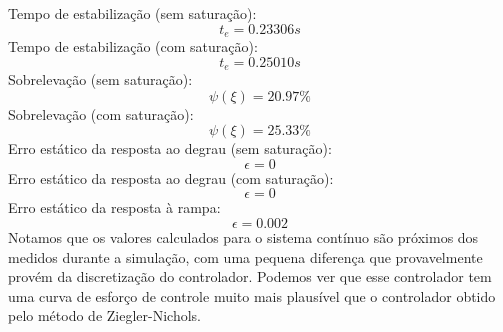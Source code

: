 \documentclass{article}
\begin{document}
Tempo de estabilização (sem saturação):
\begin{equation}
t_{e} = 0.23306 s
\end{equation}
Tempo de estabilização (com saturação):
\begin{equation}
t_{e} = 0.25010 s
\end{equation}
Sobrelevação (sem saturação):
\begin{equation}
\psi(\xi) = 20.97\%
\end{equation}
Sobrelevação (com saturação):
\begin{equation}
\psi(\xi) = 25.33\%
\end{equation}
Erro estático da resposta ao degrau (sem saturação):
\begin{equation}
\epsilon = 0
\end{equation}
Erro estático da resposta ao degrau (com saturação):
\begin{equation}
\epsilon = 0
\end{equation}
Erro estático da resposta à rampa:
\begin{equation}
\epsilon = 0.002
\end{equation}
Notamos que os valores calculados para o sistema contínuo são próximos dos medidos durante a simulação, com uma pequena diferença que provavelmente provém da discretização do controlador.
Podemos ver que esse controlador tem uma curva de esforço de controle muito mais plausível que o controlador obtido pelo método de Ziegler-Nichols.
	
\begin{thebibliography}{widestlabel}
\end{thebibliography}
\end{document}
